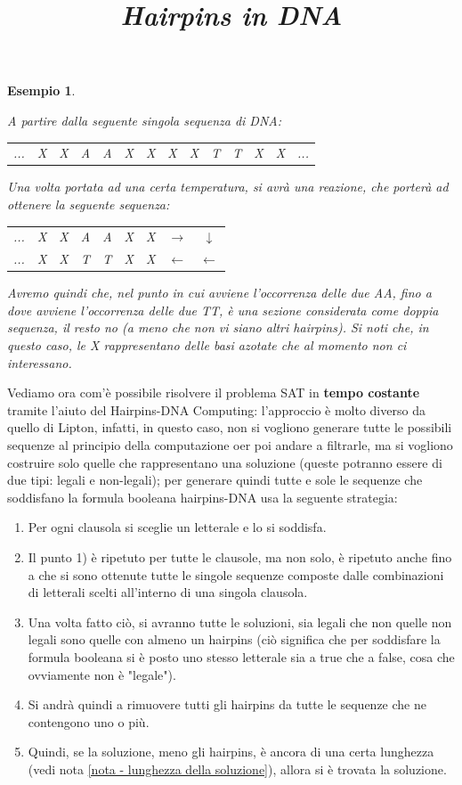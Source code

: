 \documentclass[12pt,a4paper]{report}
\newtheorem{esempio}{Esempio}[section]
\begin{document}
\begin{esempio}
\title{\emph{Hairpins in DNA}}
\label{eg - hairpins DNA}

A partire dalla seguente singola sequenza di DNA:
\begin{center}
\begin{tabular}{ c c c c c c c c c c c c c c}
 ... & X & X & A & A & X & X & X & X & T & T & X & X & ...
\end{tabular}
\end{center}
Una volta portata ad una certa temperatura, si avrà una reazione, che porterà ad ottenere la seguente sequenza:
\begin{center}
\begin{tabular}{ c c c c c c c c c }
 ... & X & X & A & A & X & X & $\rightarrow$ & $\downarrow$ \\
 ... & X & X & T & T & X & X & $\leftarrow$ & $\leftarrow$
\end{tabular}
\end{center}
Avremo quindi che, nel punto in cui avviene l'occorrenza delle due AA, fino a dove avviene l'occorrenza delle due TT, è una sezione considerata come doppia sequenza, il resto no (a meno che non vi siano altri hairpins).
Si noti che, in questo caso, le X rappresentano delle basi azotate che al momento non ci interessano.
\end{esempio}

Vediamo ora com'è possibile risolvere il problema SAT in \textbf{tempo costante} tramite l'aiuto del Hairpins-DNA Computing: l'approccio è molto diverso da quello di Lipton, infatti, in questo caso, non si vogliono generare tutte le possibili sequenze al principio della computazione oer poi andare a filtrarle, ma si vogliono costruire solo quelle che rappresentano una soluzione (queste potranno essere di due tipi: legali e non-legali); per generare quindi tutte e sole le sequenze che soddisfano la formula booleana hairpins-DNA usa la seguente strategia:
\begin{enumerate}
\item Per ogni clausola si sceglie un letterale e lo si soddisfa.
\item Il punto 1) è ripetuto per tutte le clausole, ma non solo, è ripetuto anche fino a che si sono ottenute tutte le singole sequenze composte dalle combinazioni di letterali scelti all'interno di una singola clausola.
\item Una volta fatto ciò, si avranno tutte le soluzioni, sia legali che non quelle non legali sono quelle con almeno un hairpins (ciò significa che per soddisfare la formula booleana si è posto uno stesso letterale sia a true che a false, cosa che ovviamente non è "legale").
\item Si andrà quindi a rimuovere tutti gli hairpins da tutte le sequenze che ne contengono uno o più.
\item Quindi, se la soluzione, meno gli hairpins, è ancora di una certa lunghezza (vedi nota \ref{nota - lunghezza della soluzione}), allora si è trovata la soluzione.
\end{enumerate}
\end{document}
